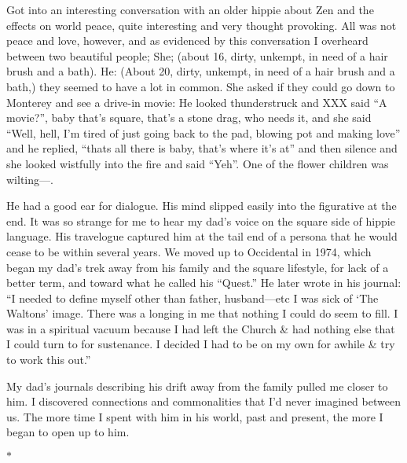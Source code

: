 \documentclass[12pt]{book}
\begin{document}
Got into an interesting conversation with an older hippie about Zen and the effects on world peace, quite interesting and very thought provoking. All was not peace and love, however, and as evidenced by this conversation I overheard between two beautiful people; She; (about 16, dirty, unkempt, in need of a hair brush and a bath). He: (About 20, dirty, unkempt, in need of a hair brush and a bath,) they seemed to have a lot in common. She asked if they could go down to Monterey and see a drive-in movie: He looked thunderstruck and XXX said ``A movie?'', baby that's square, that's a stone drag, who needs it, and she said ``Well, hell, I'm tired of just going back to the pad, blowing pot and making love'' and he replied, ``thats all there is baby, that's where it's at'' and then silence and she looked wistfully into the fire and said ``Yeh''. One of the flower children was wilting---.

He had a good ear for dialogue. His mind slipped easily into the figurative at the end. It was so strange for me to hear my dad's voice on the square side of hippie language. His travelogue captured him at the tail end of a persona that he would cease to be within several years. We moved up to Occidental in 1974, which began my dad's trek away from his family and the square lifestyle, for lack of a better term, and toward what he called his ``Quest.'' He later wrote in his journal: ``I needed to define myself other than father, husband---etc I was sick of `The Waltons' image. There was a longing in me that nothing I could do seem to fill. I was in a spiritual vacuum because I had left the Church \& had nothing else that I could turn to for sustenance. I decided I had to be on my own for awhile \& try to work this out.''

My dad's journals describing his drift away from the family pulled me closer to him. I discovered connections and commonalities that I'd never imagined between us. The more time I spent with him in his world, past and present, the more I began to open up to him.

\begin{center}$*$\end{center}
\end{document}
